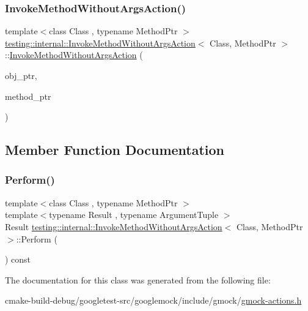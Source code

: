 \subsubsection{\texorpdfstring{InvokeMethodWithoutArgsAction()}{InvokeMethodWithoutArgsAction()}}
{\footnotesize\ttfamily template$<$class Class , typename Method\+Ptr $>$ \\
\mbox{\hyperlink{classtesting_1_1internal_1_1InvokeMethodWithoutArgsAction}{testing\+::internal\+::\+Invoke\+Method\+Without\+Args\+Action}}$<$ Class, Method\+Ptr $>$\+::\mbox{\hyperlink{classtesting_1_1internal_1_1InvokeMethodWithoutArgsAction}{Invoke\+Method\+Without\+Args\+Action}} (\begin{DoxyParamCaption}\item[{Class $\ast$}]{obj\+\_\+ptr,  }\item[{Method\+Ptr}]{method\+\_\+ptr }\end{DoxyParamCaption})\hspace{0.3cm}{\ttfamily [inline]}}



\subsection{Member Function Documentation}
\mbox{\label{classtesting_1_1internal_1_1InvokeMethodWithoutArgsAction_a9915e4f7a064e00b7798216644670b52}} 
\subsubsection{\texorpdfstring{Perform()}{Perform()}}
{\footnotesize\ttfamily template$<$class Class , typename Method\+Ptr $>$ \\
template$<$typename Result , typename Argument\+Tuple $>$ \\
Result \mbox{\hyperlink{classtesting_1_1internal_1_1InvokeMethodWithoutArgsAction}{testing\+::internal\+::\+Invoke\+Method\+Without\+Args\+Action}}$<$ Class, Method\+Ptr $>$\+::Perform (\begin{DoxyParamCaption}\item[{const Argument\+Tuple \&}]{ }\end{DoxyParamCaption}) const\hspace{0.3cm}{\ttfamily [inline]}}



The documentation for this class was generated from the following file\+:\begin{DoxyCompactItemize}
\item 
cmake-\/build-\/debug/googletest-\/src/googlemock/include/gmock/\mbox{\hyperlink{gmock-actions_8h}{gmock-\/actions.\+h}}\end{DoxyCompactItemize}
